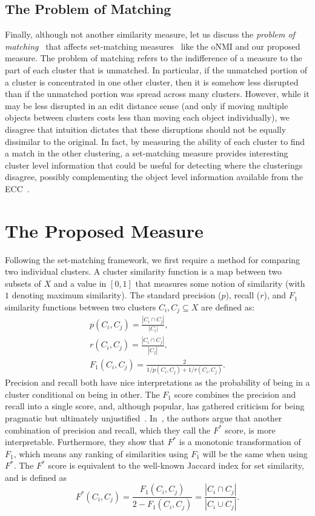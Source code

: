 \documentclass[review,los,12pt]{ryethesis}
\begin{document}
\subsection{The Problem of Matching}
Finally, although not another similarity measure, let us discuss  the \textit{problem of matching}~\cite{vi} that affects set-matching measures~\cite{setmatching} like the oNMI and our proposed measure.
The problem of matching refers to the indifference of a measure to the part of each cluster that is unmatched.
In particular, if the unmatched portion of a cluster is concentrated in one other cluster, then it is somehow less disrupted than if the unmatched portion was spread across many clusters.
However, while it may be less disrupted in an edit distance sense (and only if moving multiple objects between clusters costs less than moving each object individually), we disagree that intuition dictates that these disruptions should not be equally dissimilar to the original. 
In fact, by measuring the ability of each cluster to find a match in the other clustering, a set-matching measure provides interesting cluster level information that could be useful for detecting where the clusterings disagree, possibly complementing the object level information available from the ECC~\cite{ecc}.

\section{The Proposed Measure}

Following the set-matching framework, we first require a method for comparing two individual clusters.
A cluster similarity function is a map between two subsets of $X$ and a value in $[0,1]$ that measures some notion of similarity (with $1$ denoting maximum similarity).
The standard precision ($p$), recall ($r$), and $F_1$ similarity functions between two clusters $C_i, C_j \subseteq X$ are defined as:
\begin{gather*}
    p(C_i, C_j) = \frac{|C_i \cap C_j|}{|C_i|},\\
    r(C_i, C_j) = \frac{|C_i \cap C_j|}{|C_j|},\\
    F_1(C_i, C_j) = \frac{2}{1 / p(C_i, C_j) + 1 / r(C_i, C_j)}.
\end{gather*}
Precision and recall both have nice interpretations as the probability of being in a cluster conditional on being in other.
The $F_1$ score combines the precision and recall into a single score, and, although popular, has gathered criticism for being pragmatic but ultimately unjustified~\cite{F-review}.
In~\cite{f*_hand}, the authors argue that another combination of precision and recall, which they call the $F^*$ score, is more interpretable.
Furthermore, they show that $F^*$ is a monotonic transformation of $F_1$, which means any ranking of similarities using $F_1$ will be the same when using $F^*$.
The $F^*$ score is equivalent to the well-known Jaccard index for set similarity, and is defined as
\begin{equation}
F^*(C_i, C_j) = \frac{F_1(C_i, C_j)}{2 - F_1(C_i, C_j)} = \frac{|C_i \cap C_j|}{|C_i \cup C_j|}.
\end{equation}
\end{document}
